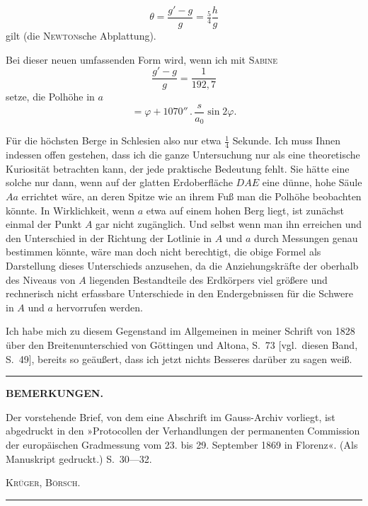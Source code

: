 \begingroup
\setlength{\abovedisplayskip}{6pt}
\setlength{\belowdisplayskip}{6pt}
\setlength{\abovedisplayshortskip}{3pt}
\setlength{\belowdisplayshortskip}{4pt}

\par\clearpage
\noindent{}\makebox[12mm][r]{}\par\medskip

\[
\theta=\frac{g'-g}{g}=\tfrac54\frac hg
\]
\noindent gilt (die \textsc{Newton}sche Abplattung).

Bei dieser neuen umfassenden Form wird, wenn ich mit \textsc{Sabine}
\[
\frac{g'-g}{g}=\frac1{192{,}7}
\]
\noindent setze, die Polhöhe in \(a\)
\[
=\varphi+1070''\,.\,\frac{s}{a_0}\sin 2\varphi.
\]

Für die höchsten Berge in Schlesien also nur etwa \(\tfrac14\) Sekunde. Ich muss
Ihnen indessen offen gestehen, dass ich die ganze Untersuchung nur als
eine theoretische Kuriosität betrachten kann, der jede praktische Bedeutung
fehlt. Sie hätte eine solche nur dann, wenn auf der glatten Erdoberfläche
\(DAE\) eine dünne, hohe Säule \(Aa\) errichtet wäre, an deren Spitze
wie an ihrem Fuß man die Polhöhe beobachten könnte. In Wirklichkeit, wenn
\(a\) etwa auf einem hohen Berg liegt, ist zunächst einmal der Punkt \(A\) gar
nicht zugänglich. Und selbst wenn man ihn erreichen und den Unterschied in der
Richtung der Lotlinie in \(A\) und \(a\) durch Messungen genau bestimmen
könnte, wäre man doch nicht berechtigt, die obige Formel als Darstellung
dieses Unterschieds anzusehen, da die Anziehungskräfte der oberhalb des
Niveaus von \(A\) liegenden Bestandteile des Erdkörpers viel größere und
rechnerisch nicht erfassbare Unterschiede in den Endergebnissen
für die Schwere in \(A\) und \(a\) hervorrufen werden.

Ich habe mich zu diesem Gegenstand im Allgemeinen in meiner Schrift
von 1828 über den Breitenunterschied von Göttingen und Altona, S.~73 [vgl.\
diesen Band, S.~49], bereits so geäußert, dass ich jetzt nichts Besseres
darüber zu sagen weiß.

\begin{center}\rule{.18\textwidth}{.4pt}\end{center}
{\small
\begin{center}\textbf{BEMERKUNGEN.}\end{center}
Der vorstehende Brief, von dem eine Abschrift im Gauss-Archiv vorliegt, ist abgedruckt in den
»Protocollen der Verhandlungen der permanenten Commission der europäischen Gradmessung vom 23. bis
29. September 1869 in Florenz«. (Als Manuskript gedruckt.) S.~30---32.
\par\hfill\textsc{Krüger, Börsch.}\hspace{.06\textwidth}\par
}
\begin{center}\rule{.24\textwidth}{.4pt}\end{center}

